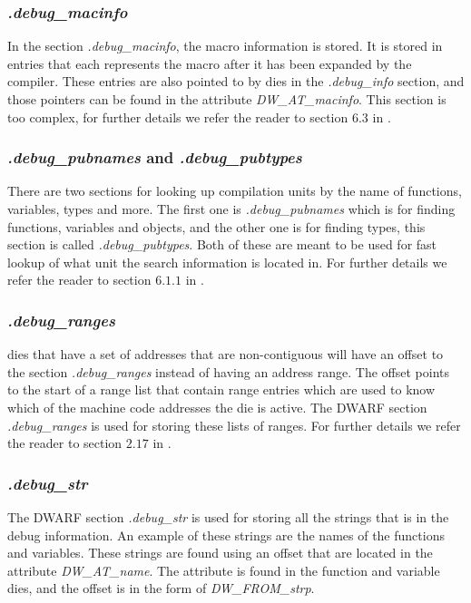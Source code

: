 \subsubsection{\emph{.debug\_macinfo}}
In the section \emph{.debug\_macinfo}, the macro information is stored.
It is stored in entries that each represents the macro after it has been expanded by the compiler.
These entries are also pointed to by \glspl{die} in the \emph{.debug\_info} section, and those pointers can be found in the attribute \emph{DW\_AT\_macinfo}.
This section is too complex, for further details we refer the reader to section $6.3$ in \cite{dwarf}.


\subsubsection{\emph{.debug\_pubnames} and \emph{.debug\_pubtypes}}
There are two sections for looking up compilation units by the name of functions, variables, types and more.
The first one is \emph{.debug\_pubnames} which is for finding functions, variables and objects, and the other one is for finding types, this section is called \emph{.debug\_pubtypes}.
Both of these are meant to be used for fast lookup of what unit the search information is located in.
For further details we refer the reader to section $6.1.1$ in \cite{dwarf}.


\subsubsection{\emph{.debug\_ranges}}
\Glspl{die} that have a set of addresses that are non-contiguous will have an offset to the section \emph{.debug\_ranges} instead of having an address range.
The offset points to the start of a range list that contain range entries which are used to know which of the machine code addresses the \gls{die} is active.
The \gls{DWARF} section \emph{.debug\_ranges} is used for storing these lists of ranges.
For further details we refer the reader to section $2.17$ in \cite{dwarf}.


\subsubsection{\emph{.debug\_str}}
The \gls{DWARF} section \emph{.debug\_str} is used for storing all the strings that is in the debug information.
An example of these strings are the names of the functions and variables.
These strings are found using an offset that are located in the attribute \emph{DW\_AT\_name}.
The attribute is found in the function and variable \glspl{die}, and the offset is in the form of \emph{DW\_FROM\_strp}.


